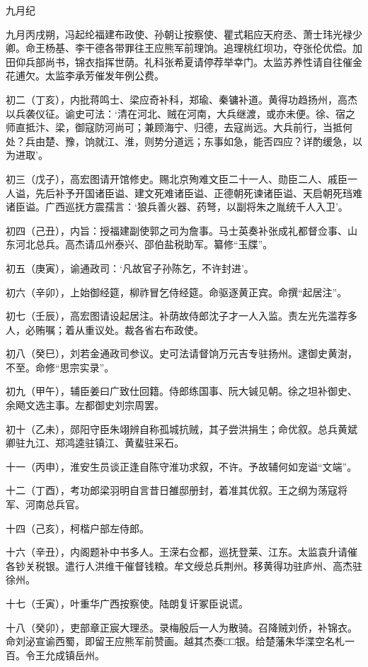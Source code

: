 \documentclass[]{article}
\begin{document}
九月纪

九月丙戌朔，冯起纶福建布政使、孙朝让按察使、瞿式耜应天府丞、萧士玮光禄少卿。命王杨基、李干德各带罪往王应熊军前理饷。追理桃红坝功，夺张伦优偿。加田仰兵部尚书，锦衣指挥世荫。礼科张希夏请停荐举幸门。太监苏养性请自往催金花逋欠。太监李承芳催发年例公费。

初二（丁亥），内批蒋鸣士、梁应奇补科，郑瑜、秦镛补道。黄得功趋扬州，高杰以兵袭仪征。谕史可法：`清在河北、贼在河南，大兵继渡，或亦未便。徐、宿之师直抵汴、梁，御寇防河尚可；兼顾海宁、归德，去寇尚远。大兵前行，当抵何处？兵由楚、豫，饷就江、淮，则势分道远；东事如急，能否四应？详酌缓急，以为进取'。

初三（戊子），高宏图请开馆修史。赐北京殉难文臣二十一人、勋臣二人、戚臣一人谥，先后补予开国诸臣谥、建文死难诸臣谥、正德朝死谏诸臣谥、天启朝死珰难诸臣谥。广西巡抚方震孺言：`狼兵善火器、药弩，以副将朱之胤统千人入卫'。

初四（己丑），内旨：授福建副使郭之司为詹事。马士英奏补张成礼都督佥事、山东河北总兵。高杰请瓜州泰兴、邵伯盐税助军。纂修``玉牒''。

初五（庚寅），谕通政司：`凡故官子孙陈乞，不许封进'。

初六（辛卯），上始御经筵，柳祚冒乞侍经筵。命驱逐黄正宾。命撰``起居注''。

初七（壬辰），高宏图请设起居注。补荫故侍郎沈子才一人入监。责左光先滥荐多人，必贿嘱；着从重议处。裁各省右布政使。

初八（癸巳），刘若金通政司参议。史可法请督饷万元吉专驻扬州。逮御史黄澍，不至。命修``思宗实录''。

初九（甲午），辅臣姜曰广致仕回籍。侍郎练国事、阮大铖见朝。徐之坦补御史、余飏文选主事。左都御史刘宗周罢。

初十（乙未），郧阳守臣朱翊辨自称孤城抗贼，其子尝洪捐生；命优叙。总兵黄斌卿驻九江、郑鸿逵驻镇江、黄蜚驻采石。

十一（丙申），淮安生员谈正逢自陈守淮功求叙，不许。予故辅何如宠谥``文端''。

十二（丁酉），考功郎梁羽明自言昔日雒邸册封，着准其优叙。王之纲为荡寇将军、河南总兵官。

十四（己亥），柯楷户部左侍郎。

十六（辛丑），内阁题补中书多人。王溁右佥都，巡抚登莱、江东。太监袁升请催各钞关税银。遣行人洪维干催督钱粮。牟文绶总兵荆州。移黄得功驻庐州、高杰驻徐州。

十七（壬寅），叶重华广西按察使。陆朗复讦冢臣说谎。

十八（癸卯），吏部章正宸大理丞。录梅殷后一人为散骑。召降贼刘侨，补锦衣。命刘泌宣谕西蜀，即留王应熊军前赞画。越其杰奏□□银。给楚藩朱华渫空名札一百。令王允成镇岳州。
\end{document}
